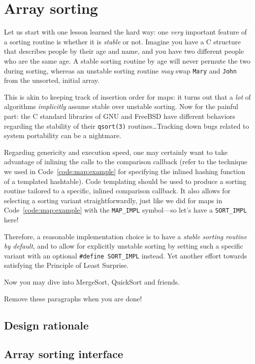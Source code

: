 \chapter{Array sorting}\label{chap:sorting}

Let us start with one lesson learned the hard way: one \textit{very} important feature of a sorting routine is whether it is \textit{stable} or not. Imagine you have a C structure that describes people by their age and name, and you have two different people who are the same age. A stable sorting routine by age will never permute the two during sorting, whereas an unstable sorting routine \textit{may} swap \texttt{Mary} and \texttt{John} from the unsorted, initial array.

This is akin to keeping track of insertion order for maps: it turns out that a \textit{lot} of algorithms \textit{implicitly} assume stable over unstable sorting. Now for the painful part: the C standard libraries of GNU and FreeBSD have different behaviors regarding the stability of their \texttt{qsort(3)} routines\dots Tracking down bugs related to system portability can be a nightmare. 

Regarding genericity and execution speed, one may certainly want to take advantage of inlining the calls to the comparison callback (refer to the technique we used in Code~\ref{code:map:example} for specifying the inlined hashing function of a templated hashtable). Code templating should be used to produce a sorting routine tailored to a specific, inlined comparison callback. It also allows for selecting a sorting variant straightforwardly, just like we did for maps in Code~\ref{code:map:example} with the \texttt{MAP\_IMPL} symbol---so let's have a \texttt{SORT\_IMPL} here!

Therefore, a reasonable implementation choice is to have a \textit{stable sorting routine by default}, and to allow for explicitly unstable sorting by setting such a specific variant with an optional \texttt{\#define SORT\_IMPL} instead. Yet another effort towards satisfying the Principle of Least Surprise. 

Now you may dive into MergeSort, QuickSort and friends.

Remove these paragraphs when you are done!

\section{Design rationale}

\section{Array sorting interface}

